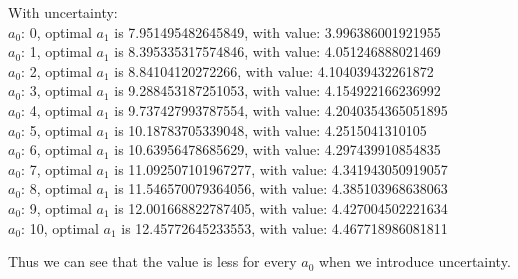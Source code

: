 \documentclass[12pt]{article}
\begin{document}
\begin{enumerate}
With uncertainty:
\\$a_0$: 0, optimal $a_1$ is 7.951495482645849, with value: 3.996386001921955
\\$a_0$: 1, optimal $a_1$ is 8.395335317574846, with value: 4.051246888021469
\\$a_0$: 2, optimal $a_1$ is 8.84104120272266, with value: 4.104039432261872
\\$a_0$: 3, optimal $a_1$ is 9.288453187251053, with value: 4.154922166236992
\\$a_0$: 4, optimal $a_1$ is 9.737427993787554, with value: 4.2040354365051895
\\$a_0$: 5, optimal $a_1$ is 10.18783705339048, with value: 4.2515041310105
\\$a_0$: 6, optimal $a_1$ is 10.63956478685629, with value: 4.297439910854835
\\$a_0$: 7, optimal $a_1$ is 11.092507101967277, with value: 4.341943050919057
\\$a_0$: 8, optimal $a_1$ is 11.546570079364056, with value: 4.385103968638063
\\$a_0$: 9, optimal $a_1$ is 12.001668822787405, with value: 4.427004502221634
\\$a_0$: 10, optimal $a_1$ is 12.45772645233553, with value: 4.467718986081811

Thus we can see that the value is less for every $a_0$ when we introduce uncertainty.


\end{enumerate}
\end{document}
